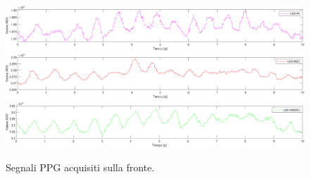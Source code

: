 \begin{figure}[h]
	\centering
	\includegraphics[width=1\linewidth]{ImageFiles/Misure Preliminari/Soggetto 1/MAXM86161/fronte_ired}
	\includegraphics[width=1\linewidth]{ImageFiles/Misure Preliminari/Soggetto 1/MAXM86161/fronte_red}
	\includegraphics[width=1\linewidth]{ImageFiles/Misure Preliminari/Soggetto 1/MAXM86161/fronte_green}
	\caption{Segnali PPG acquisiti sulla fronte.}
	\label{fig:soggetto1_MAXM86161_fronte}
\end{figure}




\clearpage
